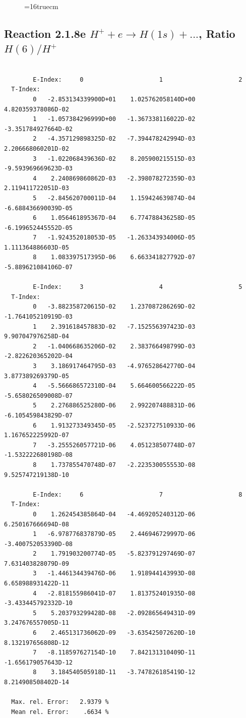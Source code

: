 \documentclass[12pt,dvips]{article}
\begin{document}
\begin{figure} \label{2.1.8rd}
\epsfxsize=16truecm
\end{figure}
\newpage



\subsection{
Reaction 2.1.8e  $H^+ + e \rightarrow H(1s) + ...$,  Ratio $H(6)/H^+$
}

\begin{small}\begin{verbatim}

        E-Index:     0                     1                     2
  T-Index:
        0   -2.853134339900D+01    1.025762058140D+00    4.820359378086D-02
        1   -1.057384296999D+00   -1.367338116022D-02   -3.351784927664D-02
        2   -4.357129898325D-02   -7.394478242994D-03    2.206668060201D-02
        3   -1.022068439636D-02    8.205900215515D-03   -9.593969669623D-03
        4    2.240869860862D-03   -2.398078272359D-03    2.119411722051D-03
        5   -2.845620700011D-04    1.159424639874D-04   -6.688436690039D-05
        6    1.056461895367D-04    6.774788436258D-05   -6.199652445552D-05
        7   -1.924352018053D-05   -1.263343934006D-05    1.111364886603D-05
        8    1.083397517395D-06    6.663341827792D-07   -5.889621084106D-07

        E-Index:     3                     4                     5
  T-Index:
        0   -3.882358720615D-02    1.237087286269D-02   -1.764105210919D-03
        1    2.391618457883D-02   -7.152556397423D-03    9.907047976258D-04
        2   -1.040668635206D-02    2.383766498799D-03   -2.822620365202D-04
        3    3.186917464795D-03   -4.976528642770D-04    3.877389269379D-05
        4   -5.566686572310D-04    5.664600566222D-05   -5.658026509008D-07
        5    2.276886525280D-06    2.992207488831D-06   -6.105459843829D-07
        6    1.913273349345D-05   -2.523727510933D-06    1.167652225992D-07
        7   -3.255526057721D-06    4.051238507748D-07   -1.532222680198D-08
        8    1.737855470748D-07   -2.223530055553D-08    9.525747219138D-10

        E-Index:     6                     7                     8
  T-Index:
        0    1.262454385864D-04   -4.469205240312D-06    6.250167666694D-08
        1   -6.978776837879D-05    2.446946729997D-06   -3.400752053390D-08
        2    1.791903200774D-05   -5.823791297469D-07    7.631403828079D-09
        3   -1.446134439476D-06    1.918944143993D-08    6.658988931422D-11
        4   -2.818155986041D-07    1.813752401935D-08   -3.433445792332D-10
        5    5.203793299428D-08   -2.092865649431D-09    3.247676557005D-11
        6    2.465131736062D-09   -3.635425072620D-10    8.132197656808D-12
        7   -8.118597627154D-10    7.842131310409D-11   -1.656179057643D-12
        8    3.184540505918D-11   -3.747826185419D-12    8.214908508402D-14

  Max. rel. Error:   2.9379 %
  Mean rel. Error:    .6634 %


\end{verbatim}\end{small}
\end{document}
